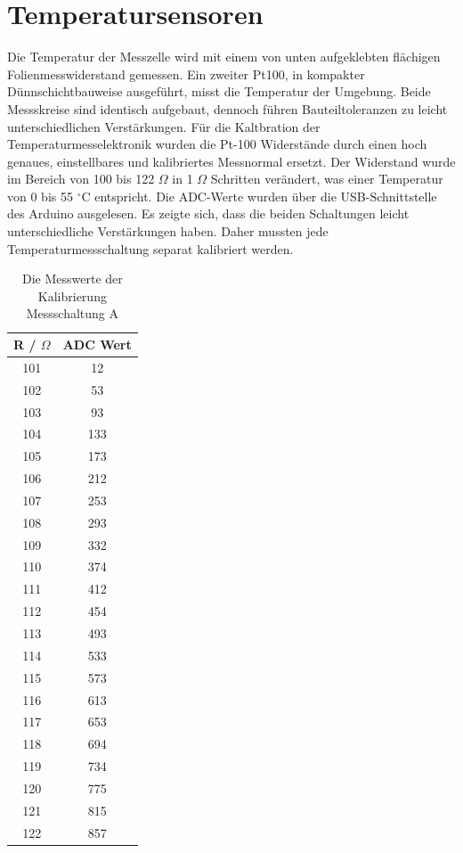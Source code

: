 \documentclass[a4paper,bibtotoc,oneside]{scrbook}
\begin{document}
\section{Temperatursensoren}\thispagestyle{empty}
Die Temperatur der Messzelle wird mit einem von unten aufgeklebten flächigen Folienmesswiderstand gemessen. 
Ein zweiter Pt100, in kompakter Dünnschichtbauweise ausgeführt, misst die Temperatur der Umgebung. Beide Messskreise sind identisch aufgebaut, dennoch führen Bauteiltoleranzen zu leicht unterschiedlichen Verstärkungen.
Für die Kaltbration der Temperaturmesselektronik wurden die Pt-100 Widerstände durch einen hoch genaues, einstellbares und kalibriertes Messnormal ersetzt. Der Widerstand wurde im Bereich von 100 bis 122 	$\Omega$  in 1 $\Omega$  Schritten verändert, was einer Temperatur von 0 bis 55 $^{\circ}$C entspricht. Die ADC-Werte wurden über die USB-Schnittstelle des Arduino ausgelesen. Es zeigte sich, dass die beiden Schaltungen leicht unterschiedliche Verstärkungen haben. Daher mussten jede Temperaturmessschaltung separat kalibriert werden.  

\begin{table}[htbp]
\centering
\begin{tabular}{ | c | c | }\hline
{\bf R / $\Omega$ } & {\bf ADC Wert}\\ \hline
\hline
101 & 12\\ \hline
102 & 53\\ \hline
103 & 93\\ \hline
104 & 133\\ \hline
105 & 173\\ \hline
106 & 212\\ \hline
107 & 253\\ \hline
108 & 293\\ \hline
109 & 332\\ \hline
110 & 374\\ \hline
111 & 412\\ \hline
112 & 454\\ \hline
113 & 493\\ \hline
114 & 533\\ \hline
115 & 573\\ \hline
116 & 613\\ \hline
117 & 653\\ \hline
118 & 694\\ \hline
119 & 734\\ \hline
120 & 775\\ \hline
121 & 815\\ \hline
122 & 857\\ \hline
\end{tabular}
\caption{Die Messwerte der Kalibrierung Messschaltung A}\label{TabA}
\end{table}
\end{document}
